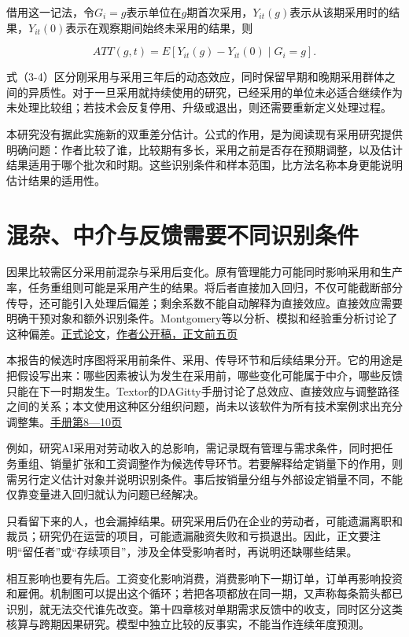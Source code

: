 \documentclass[UTF8,fontset=windows,12pt,a4paper,oneside,openany]{ctexbook}
\begin{document}
借用这一记法，令\(G_i=g\)表示单位在\(g\)期首次采用，\(Y_{it}(g)\)表示从该期采用时的结果，\(Y_{it}(0)\)表示在观察期间始终未采用的结果，则

\[
ATT(g,t)=E[Y_{it}(g)-Y_{it}(0)\mid G_i=g].
\tag{3-4}
\]

式（3-4）区分刚采用与采用三年后的动态效应，同时保留早期和晚期采用群体之间的异质性。对于一旦采用就持续使用的研究，已经采用的单位未必适合继续作为未处理比较组；若技术会反复停用、升级或退出，则还需要重新定义处理过程。

本研究没有据此实施新的双重差分估计。公式的作用，是为阅读现有采用研究提供明确问题：作者比较了谁，比较期有多长，采用之前是否存在预期调整，以及估计结果适用于哪个批次和时期。这些识别条件和样本范围，比方法名称本身更能说明估计结果的适用性。

\section{混杂、中介与反馈需要不同识别条件}

因果比较需区分采用前混杂与采用后变化。原有管理能力可能同时影响采用和生产率，任务重组则可能是采用产生的结果。将后者直接加入回归，不仅可能截断部分传导，还可能引入处理后偏差；剩余系数不能自动解释为直接效应。直接效应需要明确干预对象和额外识别条件。Montgomery等以分析、模拟和经验重分析讨论了这种偏差。\href{https://doi.org/10.1111/ajps.12357}{正式论文}，\href{https://cpb-us-e1.wpmucdn.com/sites.dartmouth.edu/dist/5/2293/files/2021/03/post-treatment-bias.pdf}{作者公开稿，正文前五页}

本报告的候选时序图将采用前条件、采用、传导环节和后续结果分开。它的用途是把假设写出来：哪些因素被认为发生在采用前，哪些变化可能属于中介，哪些反馈只能在下一时期发生。Textor的DAGitty手册讨论了总效应、直接效应与调整路径之间的关系；本文使用这种区分组织问题，尚未以该软件为所有技术案例求出充分调整集。\href{https://www.dagitty.net/manual-3.x.pdf}{手册第8—10页}

例如，研究AI采用对劳动收入的总影响，需记录既有管理与需求条件，同时把任务重组、销量扩张和工资调整作为候选传导环节。若要解释给定销量下的作用，则需另行定义估计对象并说明识别条件。事后按销量分组与外部设定销量不同，不能仅靠变量进入回归就认为问题已经解决。

只看留下来的人，也会漏掉结果。研究采用后仍在企业的劳动者，可能遗漏离职和裁员；研究仍在运营的项目，可能遗漏融资失败和亏损退出。因此，正文要注明“留任者”或“存续项目”，涉及全体受影响者时，再说明还缺哪些结果。

相互影响也要有先后。工资变化影响消费，消费影响下一期订单，订单再影响投资和雇佣。机制图可以提出这个循环；若把各项都放在同一期，又声称每条箭头都已识别，就无法交代谁先改变。第十四章核对单期需求反馈中的收支，同时区分这类核算与跨期因果研究。模型中独立比较的反事实，不能当作连续年度预测。
\end{document}
